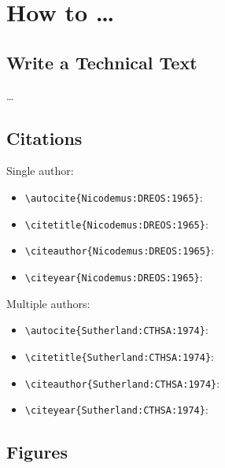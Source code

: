 
\chapter{How to \ldots}
\label{app:how-to}

\section{Write a Technical Text}
\label{app:how-to:write+a+technical+text}

\ldots
\par

\section{Citations}
\label{app:how-to:citations}

Single author:
\begin{itemize}
\item \verb!\autocite{Nicodemus:DREOS:1965}!: \autocite{Nicodemus:DREOS:1965}
\item \verb!\citetitle{Nicodemus:DREOS:1965}!: 
\item \verb!\citeauthor{Nicodemus:DREOS:1965}!: \citeauthor{Nicodemus:DREOS:1965}
\item \verb!\citeyear{Nicodemus:DREOS:1965}!: \citeyear{Nicodemus:DREOS:1965}
\end{itemize}
Multiple authors:
\begin{itemize}
\item \verb!\autocite{Sutherland:CTHSA:1974}!: \autocite{Sutherland:CTHSA:1974}
\item \verb!\citetitle{Sutherland:CTHSA:1974}!: 
\item \verb!\citeauthor{Sutherland:CTHSA:1974}!: \citeauthor{Sutherland:CTHSA:1974}
\item \verb!\citeyear{Sutherland:CTHSA:1974}!: \citeyear{Sutherland:CTHSA:1974}
\end{itemize}
\par

\section{Figures}
\label{app:how-to:figures}


